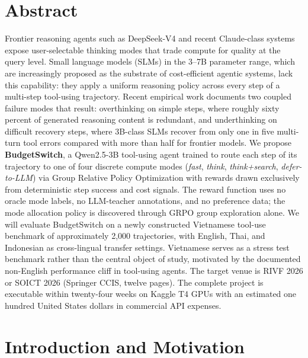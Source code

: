 \documentclass[11pt,a4paper]{article}
\begin{document}
\section*{Abstract}

Frontier reasoning agents such as DeepSeek-V4 and recent Claude-class systems expose user-selectable thinking modes that trade compute for quality at the query level. Small language models (SLMs) in the 3--7B parameter range, which are increasingly proposed as the substrate of cost-efficient agentic systems, lack this capability: they apply a uniform reasoning policy across every step of a multi-step tool-using trajectory. Recent empirical work documents two coupled failure modes that result: overthinking on simple steps, where roughly sixty percent of generated reasoning content is redundant, and underthinking on difficult recovery steps, where 3B-class SLMs recover from only one in five multi-turn tool errors compared with more than half for frontier models. We propose \textbf{BudgetSwitch}, a Qwen2.5-3B tool-using agent trained to route each step of its trajectory to one of four discrete compute modes (\textit{fast}, \textit{think}, \textit{think+search}, \textit{defer-to-LLM}) via Group Relative Policy Optimization with rewards drawn exclusively from deterministic step success and cost signals. The reward function uses no oracle mode labels, no LLM-teacher annotations, and no preference data; the mode allocation policy is discovered through GRPO group exploration alone. We will evaluate BudgetSwitch on a newly constructed Vietnamese tool-use benchmark of approximately 2{,}000 trajectories, with English, Thai, and Indonesian as cross-lingual transfer settings. Vietnamese serves as a stress test benchmark rather than the central object of study, motivated by the documented non-English performance cliff in tool-using agents. The target venue is RIVF 2026 or SOICT 2026 (Springer CCIS, twelve pages). The complete project is executable within twenty-four weeks on Kaggle T4 GPUs with an estimated one hundred United States dollars in commercial API expenses.

\vspace{1em}

\section{Introduction and Motivation}
\end{document}
